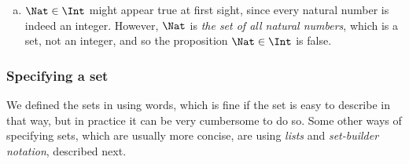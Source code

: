 \begin{exercise}
{\begin{enumerate}[(a)]
\item $\Nat \in \Int$ might appear true at first sight, since every natural number is indeed an integer. However, $\Nat$ is \textit{the set of all natural numbers}, which is a set, not an integer, and so the proposition $\Nat \in \Int$ is false.
\end{enumerate}
}
\vspace{-20pt}
\end{exercise}

\subsubsection*{Specifying a set}

We defined the sets in  using words, which is fine if the set is easy to describe in that way, but in practice it can be very cumbersome to do so. Some other ways of specifying sets, which are usually more concise, are using \textit{lists} and \textit{set-builder notation}, described next.


